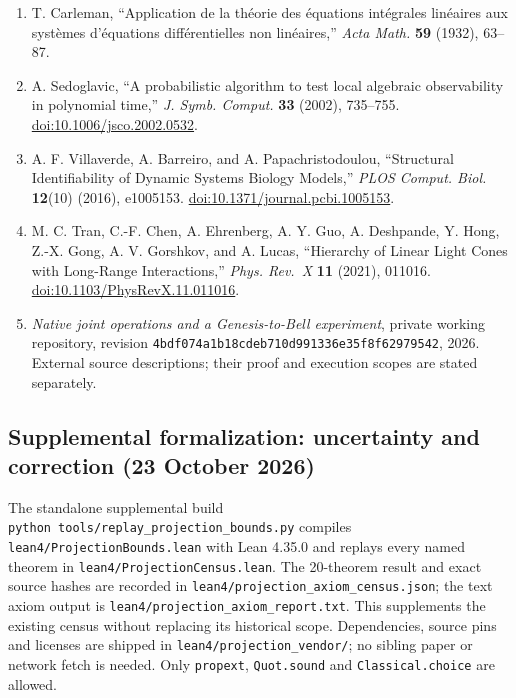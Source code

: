 \documentclass[
  11pt,
]{article}
\begin{document}
\begin{enumerate}
\item
  T. Carleman, ``Application de la théorie des équations intégrales linéaires aux systèmes d'équations différentielles non linéaires,'' \emph{Acta Math.} \textbf{59} (1932), 63--87.
\item
  A. Sedoglavic, ``A probabilistic algorithm to test local algebraic observability in polynomial time,'' \emph{J. Symb. Comput.} \textbf{33} (2002), 735--755. \href{https://doi.org/10.1006/jsco.2002.0532}{doi:10.1006/jsco.2002.0532}.
\item
  A. F. Villaverde, A. Barreiro, and A. Papachristodoulou, ``Structural Identifiability of Dynamic Systems Biology Models,'' \emph{PLOS Comput. Biol.} \textbf{12}(10) (2016), e1005153. \href{https://doi.org/10.1371/journal.pcbi.1005153}{doi:10.1371/journal.pcbi.1005153}.
\item
  M. C. Tran, C.-F. Chen, A. Ehrenberg, A. Y. Guo, A. Deshpande, Y. Hong, Z.-X. Gong, A. V. Gorshkov, and A. Lucas, ``Hierarchy of Linear Light Cones with Long-Range Interactions,'' \emph{Phys. Rev.~X} \textbf{11} (2021), 011016. \href{https://doi.org/10.1103/PhysRevX.11.011016}{doi:10.1103/PhysRevX.11.011016}.
\item
  \emph{Native joint operations and a Genesis-to-Bell experiment}, private working repository, revision \texttt{4bdf074a1b18cdeb710d991336e35f8f62979542}, 2026. External source descriptions; their proof and execution scopes are stated separately.
\end{enumerate}

\subsection{Supplemental formalization: uncertainty and correction (23 October 2026)}\label{supplemental-formalization-uncertainty-and-correction-23-october-2026}

The standalone supplemental build \texttt{python\ tools/replay\_projection\_bounds.py}
compiles \texttt{lean4/ProjectionBounds.lean} with Lean 4.35.0 and replays every named
theorem in \texttt{lean4/ProjectionCensus.lean}. The 20-theorem result and exact source
hashes are recorded in \texttt{lean4/projection\_axiom\_census.json}; the text axiom
output is \texttt{lean4/projection\_axiom\_report.txt}. This supplements the existing
census without replacing its historical scope. Dependencies, source pins and
licenses are shipped in \texttt{lean4/projection\_vendor/}; no sibling paper or network
fetch is needed. Only \texttt{propext}, \texttt{Quot.sound} and \texttt{Classical.choice} are allowed.
\end{document}
